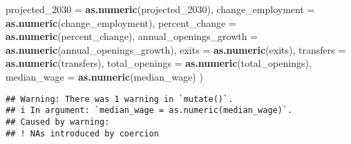 \documentclass[
]{article}
\newenvironment{Shaded}{\begin{snugshade}}{\end{snugshade}}
\newcommand{\AttributeTok}[1]{\textcolor[rgb]{0.13,0.29,0.53}{#1}}
\newcommand{\FunctionTok}[1]{\textcolor[rgb]{0.13,0.29,0.53}{\textbf{#1}}}
\newcommand{\NormalTok}[1]{#1}
\begin{document}
\begin{Shaded}
\begin{Highlighting}[]
    \AttributeTok{projected\_2030 =} \FunctionTok{as.numeric}\NormalTok{(projected\_2030),}
    \AttributeTok{change\_employment =} \FunctionTok{as.numeric}\NormalTok{(change\_employment),}
    \AttributeTok{percent\_change =} \FunctionTok{as.numeric}\NormalTok{(percent\_change),}
    \AttributeTok{annual\_openings\_growth =} \FunctionTok{as.numeric}\NormalTok{(annual\_openings\_growth),}
    \AttributeTok{exits =} \FunctionTok{as.numeric}\NormalTok{(exits),}
    \AttributeTok{transfers =} \FunctionTok{as.numeric}\NormalTok{(transfers),}
    \AttributeTok{total\_openings =} \FunctionTok{as.numeric}\NormalTok{(total\_openings),}
    \AttributeTok{median\_wage =} \FunctionTok{as.numeric}\NormalTok{(median\_wage)}
\NormalTok{  )}
\end{Highlighting}
\end{Shaded}

\begin{verbatim}
## Warning: There was 1 warning in `mutate()`.
## i In argument: `median_wage = as.numeric(median_wage)`.
## Caused by warning:
## ! NAs introduced by coercion
\end{verbatim}
\end{document}
